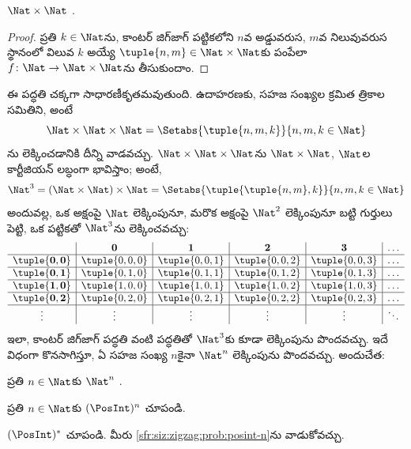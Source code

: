 \documentclass[../../../include/open-logic-section]{subfiles}
\begin{document}
\begin{prop}
$\Nat \times \Nat$ .
\end{prop}

\begin{proof}
ప్రతి $k \in \Nat$ను, కాంటర్ జిగ్‌జాగ్ పట్టికలోని $n$వ అడ్డువరుస,
$m$వ నిలువువరుస స్థానంలో విలువ $k$ అయ్యే $\tuple{n,m} \in
\Nat \times \Nat$కు పంపేలా $f \colon \Nat \to \Nat\times\Nat$ను
తీసుకుందాం.
\end{proof}

\begin{explain}
ఈ పద్ధతి చక్కగా సాధారణీకృతమవుతుంది. ఉదాహరణకు, సహజ సంఖ్యల క్రమిత
త్రికాల సమితిని, అంటే
\[
\Nat \times \Nat \times \Nat = \Setabs{\tuple{n,m,k}}{n,m,k \in \Nat}
\]
ను లెక్కించడానికి దీన్ని వాడవచ్చు. $\Nat \times \Nat \times \Nat$ను
$\Nat \times \Nat$, $\Nat$ల కార్టీజియన్ లబ్ధంగా భావిస్తాం; అంటే,
\[
\Nat^3 = (\Nat \times \Nat) \times \Nat =
\Setabs{\tuple{\tuple{n,m},k}}{n, m, k
  \in \Nat }
\]
అందువల్ల, ఒక అక్షంపై $\Nat$ లెక్కింపునూ, మరొక అక్షంపై
$\Nat^2$ లెక్కింపునూ బట్టి గుర్తులు పెట్టి, ఒక పట్టికతో $\Nat^3$ను
లెక్కించవచ్చు:
\[
\begin{array}{ c | c | c | c | c | c}
& \mathbf 0 & \mathbf 1 & \mathbf 2 & \mathbf 3 & \dots \\
\hline
\mathbf{\tuple{0,0}} & \tuple{0,0,0} & \tuple{0,0,1} & \tuple{0,0,2} & \tuple{0,0,3} & \dots \\
\hline
\mathbf{\tuple{0,1}} & \tuple{0,1,0} & \tuple{0,1,1} & \tuple{0,1,2} & \tuple{0,1,3} & \dots \\
\hline
\mathbf{\tuple{1,0}} & \tuple{1,0,0} & \tuple{1,0,1} & \tuple{1,0,2} & \tuple{1,0,3} & \dots \\
\hline
\mathbf{\tuple{0,2}} & \tuple{0,2,0} & \tuple{0,2,1} & \tuple{0,2,2} & \tuple{0,2,3} & \dots\\
\hline
\vdots & \vdots & \vdots & \vdots & \vdots & \ddots \\
\end{array}
\]
ఇలా, కాంటర్ జిగ్‌జాగ్ పద్ధతి వంటి పద్ధతితో $\Nat^3$కు కూడా
లెక్కింపును పొందవచ్చు. ఇదే విధంగా కొనసాగిస్తూ, ఏ సహజ సంఖ్య $n$కైనా
$\Nat^n$ లెక్కింపును పొందవచ్చు. అందుచేత:
\end{explain}

\begin{prop}
ప్రతి $n \in \Nat$కు $\Nat^n$ .
\end{prop}

\begin{prob}\label{sfr:siz:zigzag:prob:posint-n}
ప్రతి $n \in \Nat$కు $(\PosInt)^n$  చూపండి.
\end{prob}

\begin{prob}\label{sfr:siz:zigzag:prob:posint-star}
  $(\PosInt)^*$  చూపండి. మీరు
  \cref{sfr:siz:zigzag:prob:posint-n}ను వాడుకోవచ్చు.
\end{prob}
\end{document}
